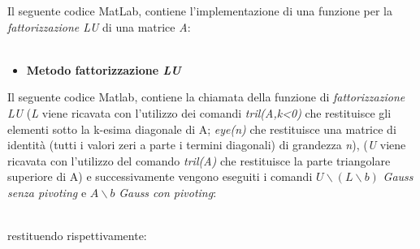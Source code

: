 Il seguente codice MatLab, contiene l'implementazione di una funzione per la \textit{fattorizzazione LU} di una matrice \textit{A}:\\\
\begin{itemize}
\item \textbf{Metodo fattorizzazione \textit{LU}}	

\end{itemize}
Il seguente codice Matlab, contiene la chiamata della funzione di \textit{fattorizzazione LU} (\textit{L} viene ricavata con l'utilizzo dei comandi \textit{tril(A,k<0)} che restituisce gli elementi sotto la k-esima diagonale di A; \textit{eye(n)} che restituisce una matrice di identità (tutti i valori zeri a parte i termini diagonali) di grandezza \textit{n}), (\textit{U} viene ricavata con l'utilizzo del comando \textit{tril(A)} che restituisce la parte triangolare superiore di A) e successivamente vengono eseguiti i comandi $U \backslash (L \backslash b)$ \textit{Gauss senza pivoting} e $A \backslash b$ \textit{Gauss con pivoting}:\\\

restituendo rispettivamente:\\\
